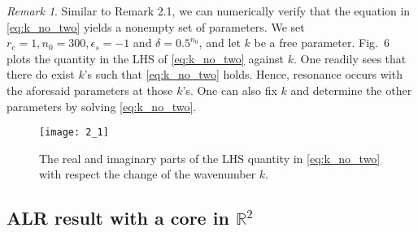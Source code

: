 \documentclass[11pt,reqno,twoside]{amsart}
\theoremstyle{definition}
\theoremstyle{remark}
\newtheorem{rem}{Remark}[section]
\numberwithin{equation}{section}
\begin{document}
\begin{rem}
Similar to Remark 2.1, we can numerically verify that the equation in \eqref{eq:k_no_two} yields a nonempty set of parameters. We set $r_e=1, n_0=300, \epsilon_s=-1$ and $\delta=0.5^{n_0}$, and let $k$ be a free parameter. Fig.~6 plots the quantity in the LHS of \eqref{eq:k_no_two} against $k$. One readily sees that there do exist $k$'s such that \eqref{eq:k_no_two} holds. Hence, resonance occurs with the aforesaid parameters at those $k$'s. One can also fix $k$ and determine the other parameters by solving \eqref{eq:k_no_two}. 
\end{rem}

\begin{figure}[t]
  \centering
 {\texttt{[image: 2\_1]}}
  \caption{The real and imaginary parts of the LHS quantity in \eqref{eq:k_no_two} with respect the change of the wavenumber $k$. }
  \label{fig:3}
\end{figure}




\subsection{ALR result with a core in $\mathbb{R}^2$}
\end{document}
